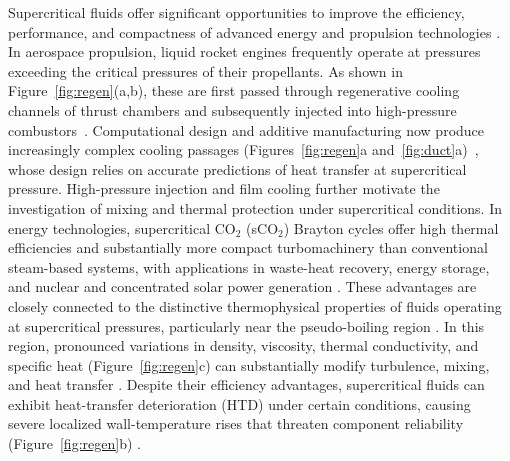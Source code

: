 \documentclass[11pt]{article}
\begin{document}
Supercritical fluids offer significant opportunities to improve the efficiency, performance, and compactness of advanced energy and propulsion technologies \cite{Li2025,Guardone2024}.
In aerospace propulsion, liquid rocket engines frequently operate at pressures exceeding the critical pressures of their propellants.
As shown in Figure~\ref{fig:regen}(a,b), these are first passed through regenerative cooling channels of thrust chambers and subsequently injected into high-pressure combustors~\cite{Nasuti2021,JofreUrzay2021}.
Computational design and additive manufacturing now produce increasingly complex cooling passages (Figures~\ref{fig:regen}a and~\ref{fig:duct}a)~\cite{LEAP71,Gradl2019}, whose design relies on accurate predictions of heat transfer at supercritical pressure.
High-pressure injection and film cooling further motivate the investigation of mixing and thermal protection under supercritical conditions.
In energy technologies, supercritical CO$_2$ (sCO$_2$) Brayton cycles offer high thermal efficiencies and substantially more compact turbomachinery than conventional steam-based systems, with applications in waste-heat recovery, energy storage, and nuclear and concentrated solar power generation \cite{Li2025,Guardone2024}.
These advantages are closely connected to the distinctive thermophysical properties of fluids operating at supercritical pressures, particularly near the pseudo-boiling region \cite{Banuti2015}.
In this region, pronounced variations in density, viscosity, thermal conductivity, and specific heat (Figure~\ref{fig:regen}c) can substantially modify turbulence, mixing, and heat transfer \cite{Li2025}.
Despite their efficiency advantages, supercritical fluids can exhibit heat-transfer deterioration (HTD) under certain conditions, causing severe localized wall-temperature rises that threaten component reliability (Figure~\ref{fig:regen}b) \cite{Pizzarelli2018,Nasuti2021,Li2025}.
\end{document}
